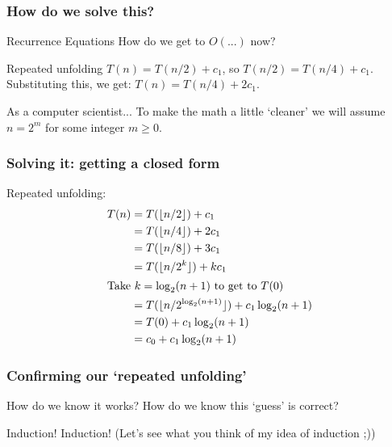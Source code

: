 \begin{frame}
	\frametitle{How do we solve this?}

	\begin{questionblock}{Recurrence Equations}
		How do we get to $O(...)$ now?
	\end{questionblock}
	\pause
	\begin{answerblock}{Repeated unfolding}
		$T(n) = T(n/2) +c_1$, so $T(n/2) = T(n/4) + c_1$.\\
		Substituting this, we get: $T(n) = T(n/4) + 2c_1$.
	\end{answerblock}
	\pause
	\begin{alertblock}{As a computer scientist...}
		To make the math a little `cleaner' we will assume $n = 2^m$ for some integer $m \geq 0$.	
	\end{alertblock}
\end{frame}

\begin{frame}
	\frametitle{Solving it: getting a closed form}

	Repeated unfolding:
	\begin{align*}
		T(n) &= T(\lfloor n/2 \rfloor) + c_1\\
				 &= T(\lfloor n/4 \rfloor) + 2c_1\\
				 &= T(\lfloor n/8 \rfloor) + 3c_1\\
				 &= T(\lfloor n/2^k \rfloor) + kc_1\\
		\intertext{Take $k= \log_2(n+1)$ to get to $T(0)$}
		     &= T(\lfloor n/2^{\log_2(n+1)} \rfloor) + c_1\log_2(n+1)\\
				 &= T(0) + c_1\log_2(n+1)\\
				 &= c_0 + c_1\log_2(n+1)
	\end{align*}
\end{frame}

\begin{frame}
	\frametitle{Confirming our `repeated unfolding'}
	\begin{questionblock}{How do we know it works?}
		How do we know this `guess' is correct?	
	\end{questionblock}
	\begin{answerblock}{Induction!}
		Induction! (Let's see what you think of my idea of induction ;))
	\end{answerblock}
\end{frame}

